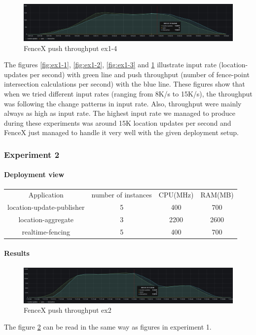 \documentclass[a4]{report}
\begin{document}
    \begin{figure}[ht]
        \caption{FenceX push throughput ex1-4}
        \label{fig:ex1-4}
        \includegraphics[scale=0.4]{images/evaluation/ex1-benchmarking(23,10).png}
    \end{figure}

    The figures \ref{fig:ex1-1}, \ref{fig:ex1-2}, \ref{fig:ex1-3} and \ref{fig:ex1-4} illustrate input rate
    (location-updates per second) with green line and push throughput (number of fence-point intersection
    calculations per second) with the blue line.
    These figures show that when we tried different input rates (ranging from 8K/s to 15K/s), the throughput was
    following the change patterns in input rate.
    Also, throughput were mainly always as high as input rate.
    The highest input rate we managed to produce during these experiments was around 15K location updates per second
    and FenceX just managed to handle it very well with the given deployment setup.

    \subsubsection{Experiment 2}
    \paragraph{Deployment view}
    \begin{center}
        \begin{tabular}{ c c c c }
            Application               &  number of instances     & CPU(MHz)  & RAM(MB)    \\
            location-update-publisher &          5               & 400       &   700      \\
            location-aggregate        &          3               & 2200      &   2600     \\
            realtime-fencing          &          5               & 400       &   700      \\
        \end{tabular}
    \end{center}

    \paragraph{Results}
    \begin{figure}[ht]
        \caption{FenceX push throughput ex2}
        \label{fig:ex2}
        \includegraphics[scale=0.4]{images/evaluation/ex2-benchmarking(24,10).png}
    \end{figure}
    The figure \ref{fig:ex2} can be read in the same way as figures in experiment 1.
    
\end{document}
